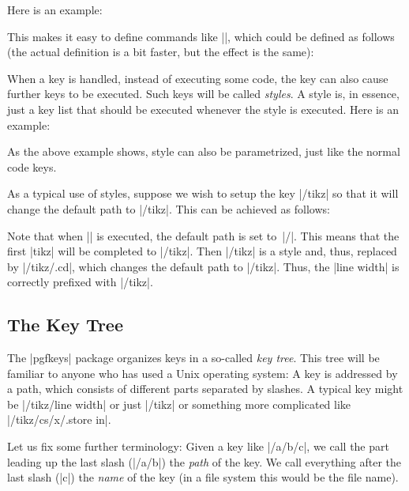 Here is an example:
\begin{codeexample}
\end{codeexample}
This makes it easy to define commands like |\tikzset|, which could be
defined as follows (the actual definition is a bit faster, but the
effect is the same):
\begin{codeexample}
\def\tikzset#1{\pgfkeys{/tikz/.cd,#1}}
\end{codeexample}

When a key is handled, instead of executing some code, the key can
also cause further keys to be executed. Such keys will be called
\emph{styles}. A style is, in essence, just a key list that should be
executed whenever the style is executed. Here is an example:
\begin{codeexample}[]
\end{codeexample}
As the above example shows, style can also be parametrized, just like
the normal code keys.

As a typical use of styles, suppose we wish to setup the key |/tikz|
so that it will change the default path to |/tikz|. This can be
achieved as follows:
\begin{codeexample}
\end{codeexample}

Note that when |\pgfkeys| is executed, the default path is set
to~|/|. This means that the first |tikz| will be completed to
|/tikz|. Then |/tikz| is a style and, thus, replaced by |/tikz/.cd|,
which changes the default path to |/tikz|. Thus, the |line width| is
correctly prefixed with |/tikz|.

\subsection{The Key Tree}

The |pgfkeys| package organizes keys in a so-called \emph{key
  tree}. This tree will be familiar to anyone who has used a Unix
operating system: A key is addressed by a path, which consists of
different parts separated by slashes. A typical key might be
|/tikz/line width| or just |/tikz| or something more complicated like
|/tikz/cs/x/.store in|.

Let us fix some further terminology: Given a key like |/a/b/c|, we
call the part leading up the last slash (|/a/b|) the \emph{path} of
the key. We call everything after the last slash (|c|) the \emph{name}
of the key (in a file system this would be the file name). 

